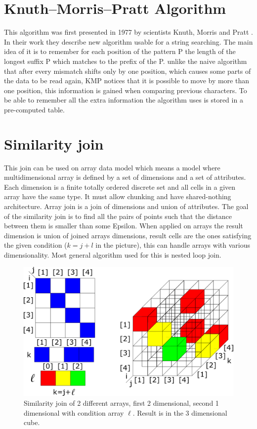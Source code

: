 \section{Knuth--Morris--Pratt Algorithm}
This algorithm was first presented in 1977 by scientists Knuth, Morris and Pratt \cite{kmp}. In their work they describe new algorithm usable for a string searching. The main idea of it is to remember for each position of the pattern P the length of the longest suffix P which matches to the prefix of the P. unlike the naive algorithm that after every mismatch shifts only by one position, which causes some parts of the data to be read again, KMP notices that it is possible to 
move by more than one position, this information is gained when comparing previous characters. To be able to remember all the extra information the algorithm uses is stored in a pre-computed table.


\section{Similarity join}
This join can be used on array data model which means a model where multidimensional array is defined by a set of dimensions and a set of attributes. Each dimension is a finite totally ordered discrete set and all cells in a given array have the same type. It must allow chunking and have shared-nothing architecture. Array join is a join of dimensions and union of attributes. The goal of the similarity join is to find all the pairs of points such that the distance between them is smaller than some Epsilon.
When applied on arrays the result dimension is union of joined arrays dimensions, result cells are the ones satisfying the given condition ($k=j+l$ in the picture), this can handle arrays with various dimensionality. Most general algorithm used for this is nested loop join. \cite{simJoin}
\begin{figure}
\centering
\includegraphics[scale=0.4]{simjoin.png}
\caption{Similarity join of 2 different arrays, first 2 dimensional, second 1 dimensional with condition array $\ell$. Result is in the 3 dimensional cube.}
\end{figure}

